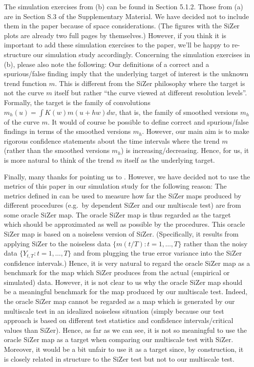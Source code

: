 \documentclass[a4paper,12pt]{article}
\begin{document}
\begin{enumerate}[label=(\arabic*),leftmargin=0.7cm]
\begin{enumerate}[label=(\alph*), leftmargin=0.7cm]
\end{enumerate}
The simulation exercises from (b) can be found in Section 5.1.2. Those from (a) are in Section S.3 of the Supplementary Material. We have decided not to include them in the paper because of space considerations. (The figures with the SiZer plots are already two full pages by themselves.) However, if you think it is important to add these simulation exercises to the paper, we'll be happy to re-structure our simulation study accordingly. \newline
%
Concerning the simulation exercises in (b), please also note the following: Our definitions of a correct and a spurious/false finding imply that the underlying target of interest is the unknown trend function $m$. This is different from the SiZer philosophy where the target is not the curve $m$ itself but rather ``the curve viewed at different resolution levels''. Formally, the target is the family of  convolutions $m_h(u) = \int K(w) m(u+hw) dw$, that is, the family of smoothed versions $m_h$ of the curve $m$. It would of course be possible to define correct and spurious/false findings in terms of the smoothed versions $m_h$. However, our main aim is to make rigorous confidence statements about the time intervals where the trend $m$ (rather than the smoothed versions $m_h$) is increasing/decreasing. Hence, for us, it is more natural to think of the trend $m$ itself as the underlying target. 

Finally, many thanks for pointing us to \cite{HannigLeePark2013}. However, we have decided not to use the metrics of this paper in our simulation study for the following reason: The metrics defined in \cite{HannigLeePark2013} can be used to measure how far the SiZer maps produced by different procedures (e.g.\ by dependent SiZer and our multiscale test) are from some oracle SiZer map. The oracle SiZer map is thus regarded as the target which should be approximated as well as possible by the procedures. This oracle SiZer map is based on a noiseless version of SiZer. (Specifically, it results from applying SiZer to the noiseless data $\{ m(t/T): t=1,\ldots,T\}$ rather than the noisy data $\{ Y_{t,T}: t=1,\ldots,T\}$ and from plugging the true error variance into the SiZer confidence intervals.) Hence, it is very natural to regard the oracle SiZer map as a benchmark for the map which SiZer produces from the actual (empirical or simulated) data. 
However, it is not clear to us why the oracle SiZer map should be a meaningful benchmark for the map produced by our multiscale test. Indeed, the oracle SiZer map cannot be regarded as a map which is generated by our multiscale test in an idealized noiseless situation (simply because our test approach is based on different test statistics and confidence intervals/critical values than SiZer). Hence, as far as we can see, it is not so meaningful to use the oracle SiZer map as a target when comparing our multiscale test with SiZer. Moreover, it would be a bit unfair to use it as a target since, by construction, it is closely related in structure to the SiZer test but not to our multiscale test. 



\end{enumerate}
\end{document}
